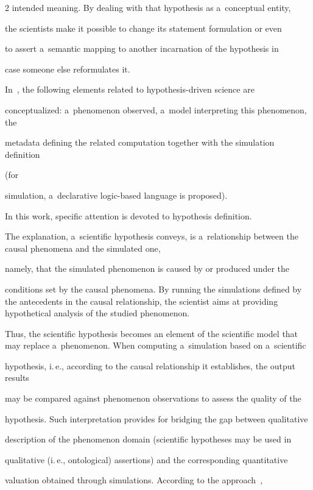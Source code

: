 \begin{multicols}{2}
intended meaning. By dealing with that hypothesis as a~conceptual  entity,


the scientists make it possible to change its statement formulation or even


to  assert a~semantic mapping to another incarnation of the hypothesis in


case someone  else reformulates it.





  In~\cite{43-kl}, the following elements related to hypothesis-driven science are


conceptualized: a~phenomenon observed, a~model interpreting this phenomenon, the


metadata defining the related computation together with the simulation definition


(for


simulation, a~declarative logic-based language is proposed).


In this work, specific attention is devoted to hypothesis definition.


The explanation, a~scientific hypothesis  conveys, is a~relationship between the causal phenomena and the simulated one,


namely, that the simulated phenomenon is caused by or produced under the


conditions set by the causal phenomena. By running the simulations defined by the antecedents in the causal relationship, the scientist aims at providing hypothetical  analysis of the studied phenomenon.





  Thus, the scientific hypothesis becomes an element of the scientific model that may replace a~phenomenon. When computing a~simulation based on a~scientific


hypothesis, i.\,e., according to the causal relationship it establishes, the output results


may be compared against phenomenon observations to assess the quality of the


hypothesis. Such interpretation provides for bridging the gap between qualitative


description of the phenomenon domain (scientific hypotheses may be used in


qualitative (i.\,e., ontological) assertions) and the corresponding quantitative


valuation obtained through simulations. According to the approach~\cite{43-kl},



\end{multicols}
